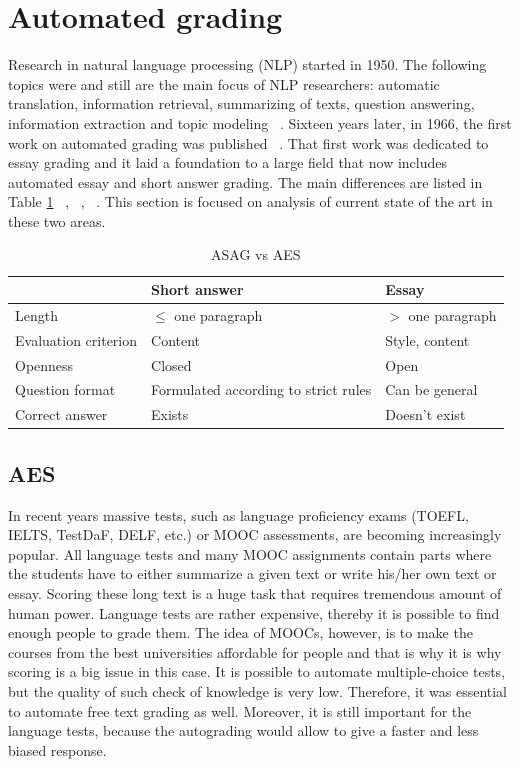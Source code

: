 \documentclass[11pt]{report}
\numberwithin{equation}{section} %
\begin{document}
\section{\textbf{Automated grading}}

Research in natural language processing (NLP) started in 1950. The following topics were and still are the main focus of NLP researchers: automatic translation, information retrieval, summarizing of texts, question answering, information extraction and topic modeling  ~\cite{Cambria}. Sixteen years later, in 1966, the first work on automated grading was published ~\cite{Page}. That first work was dedicated to essay grading and it laid a foundation to a large field that now includes automated essay and short answer grading. The main differences are listed in Table \ref{ASAGvsAES} ~\cite{Burrows}, ~\cite{Hasanah}, ~\cite{Ziai}. This section is focused on analysis of current state of the art in these two areas.

\begin{table}[h!]
\centering
\caption{ASAG vs AES}
\label{ASAGvsAES}
\begin{tabular}{|l|l|l|}
\hline
 & Short answer &  Essay \\ \hline
 Length & $\leq$ one paragraph & $>$ one paragraph  \\ \hline
 Evaluation criterion & Content &  Style, content \\ \hline
 Openness & Closed &  Open \\ \hline
 Question format & Formulated according to strict rules & Can be general \\ \hline
 Correct answer & Exists & Doesn't exist \\ \hline
\end{tabular}
\end{table}



\subsection{AES}

In recent years massive tests, such as language proficiency exams (TOEFL, IELTS, TestDaF, DELF, etc.) or MOOC assessments, are becoming increasingly popular. All language tests and many MOOC assignments contain parts where the students have to either summarize a given text or write his/her own text or essay. Scoring these long text is a huge task that requires tremendous amount of human power. Language tests are rather expensive, thereby it is possible to find enough people to grade them. The idea of MOOCs, however, is to make the courses from the best universities affordable for people and that is why it is why scoring is a big issue in this case. It is possible to automate multiple-choice tests, but the quality of such check of knowledge is very low. Therefore, it was essential to automate free text grading as well. Moreover, it is still important for the language tests, because the autograding would allow to give a faster and less biased response.\\
\end{document}
